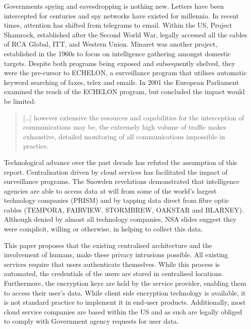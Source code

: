 \documentclass[twocolumn,english]{article}
\begin{document}
Governments spying and eavesdropping is nothing new\cite{bbc13}. Letters have been intercepted for centuries and spy networks have existed for millennia. In recent times, attention has shifted from
telegrams to email. Within the US, Project Shamrock, established after
the Second World War, legally accessed all the cables of RCA Global,
ITT, and Western Union. Minaret was another project, established in
the 1960s to focus on intelligence gathering amongst domestic targets. Despite both programs being exposed and subsequently shelved, they
were the pre-cursor to ECHELON, a surveillance program that utilises automatic
keyword searching of faxes, telex and emails.  In 2001 the European Parliament examined the reach of the ECHELON program, but concluded the impact would be limited\cite{Schmid01}: 
\begin{quote}
[\dots] however extensive the resources and capabilities for the interception of communications may be, the extremely high volume of traffic makes exhaustive, detailed monitoring of all communications impossible in practice.
\end{quote}
 
Technological advance over the past decade has refuted the assumption of this report.  Centralisation driven by cloud services has facilitated the impact of surveillance programs. The Snowden revelations demonstrated that
intelligence agencies are able to access data at will from some of
the world\textquoteright s largest technology companies (PRISM) and
by tapping data direct from fibre optic cables (TEMPORA, FAIRVIEW,
STORMBREW, OAKSTAR and BLARNEY)\cite{guardianNSA}. Although denied by almost all technology companies, NSA slides suggest
they were complicit, willing or otherwise, in helping to collect this
data\cite{guardian13}.

This paper proposes that the existing centralised architecture and the involvement of humans, make these privacy
intrusions possible. All existing services require that users authenticate themselves.  While this process is automated, the credentials
of the users are stored in centralised locations. Furthermore, the
encryption keys are held by the service provider, enabling them to
access their user's data\cite{lambert12}. While client side encryption technology is available, it is not standard practice to implement it in end-user products. Additionally, most cloud service companies are based within the US and as such are legally obliged to comply with Government agency
requests for user data.
\end{document}
